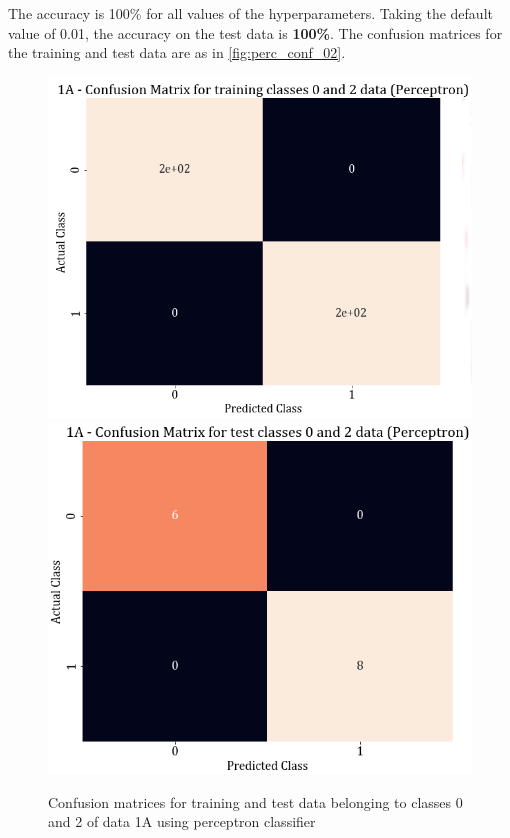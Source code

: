 \documentclass[11pt,a4paper]{article}
\newcommand{\noi}{\noindent}
\begin{document}
\noi
The accuracy is 100\% for all values of the hyperparameters. Taking the default value of 0.01, the accuracy on the test data is \textbf{100\%}. The confusion matrices for the training and test data are as in \autoref{fig:perc_conf_02}.
\begin{figure}[H]
    \centering
    \includegraphics[scale=0.35]{images/1A_perceptron_training_classes_0_and_2_confmat.png}
    \includegraphics[scale=0.35]{images/1A_perceptron_test_classes_0_and_2_confmat.png}
    \caption{Confusion matrices for training and test data belonging to classes 0 and 2 of data 1A using perceptron classifier}
    \label{fig:perc_conf_02}
\end{figure}
\end{document}
